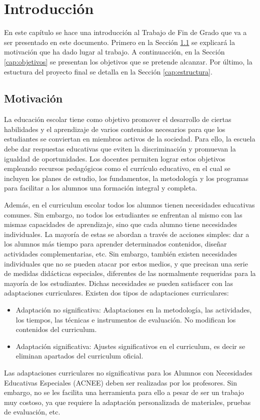 \chapter{Introducción}
\label{ch:introduccion}

En este capítulo se hace una introducción al Trabajo de Fin de Grado que va a ser presentado en este documento. Primero en la Sección \ref{cap:motivacio} se explicará la motivación que ha dado lugar al trabajo. A continuacción, en la Sección \ref{cap:objetivos} se presentan los objetivos que se pretende alcanzar. Por último, la estuctura del proyecto final se detalla en la Sección \ref{cap:estructura}.

\section{Motivación}\label{cap:motivacio}
La educación escolar tiene como objetivo promover el desarrollo de ciertas habilidades y el aprendizaje de varios contenidos necesarios para que los estudiantes se conviertan en miembros activos de la sociedad. Para ello, la escuela debe dar respuestas educativas que eviten la discriminación y promuevan la igualdad de oportunidades. Los docentes permiten lograr estos objetivos empleando recursos pedagógicos como el currículo educativo, en el cual se incluyen los planes de estudio, los fundamentos, la metodología y los programas para facilitar a los alumnos una formación integral y completa.

Además, en el curriculum escolar todos los alumnos tienen necesidades educativas comunes. Sin embargo, no todos los estudiantes se enfrentan al mismo con las mismas capacidades de aprendizaje, sino que cada alumno tiene necesidades individuales. La mayoría de estas se abordan a través de acciones simples: dar a los alumnos más tiempo para aprender determinados contenidos, diseñar actividades complementarias, etc.  Sin embargo, también existen necesidades individuales que no se pueden atacar por estos medios, y que precisan una serie de medidas didácticas especiales, diferentes de las normalmente requeridas para la mayoría de los estudiantes. Dichas necesidades se pueden satisfacer con las adaptaciones curriculares. Existen dos tipos de adaptaciones curriculares:
\begin{itemize}
    \item Adaptación no significativa: Adaptaciones en la metodología, las actividades, los tiempos, las técnicas e instrumentos de evaluación. No modifican los contenidos del curriculum.  
    \item Adaptación significativa: Ajustes significativos en el curriculum, es decir se eliminan apartados del curriculum oficial. 
\end{itemize}
Las adaptaciones curriculares no significativas para los Alumnos con Necesidades Educativas Especiales (ACNEE) deben ser realizadas por los profesores. Sin embargo, no se les facilita una herramienta para ello a pesar de ser un trabajo muy costoso, ya que requiere la adaptación personalizada de materiales, pruebas de evaluación, etc.

